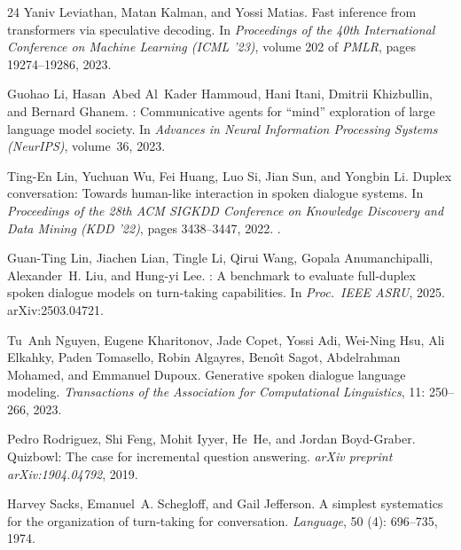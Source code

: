 \documentclass{article}
\begin{document}
\begin{thebibliography}{24}
Yaniv Leviathan, Matan Kalman, and Yossi Matias.
\newblock Fast inference from transformers via speculative decoding.
\newblock In \emph{Proceedings of the 40th International Conference on Machine Learning (ICML '23)}, volume 202 of \emph{PMLR}, pages 19274--19286, 2023.

Guohao Li, Hasan~Abed Al~Kader Hammoud, Hani Itani, Dmitrii Khizbullin, and Bernard Ghanem.
: Communicative agents for ``mind'' exploration of large language model society.
\newblock In \emph{Advances in Neural Information Processing Systems (NeurIPS)}, volume~36, 2023.

Ting-En Lin, Yuchuan Wu, Fei Huang, Luo Si, Jian Sun, and Yongbin Li.
\newblock Duplex conversation: Towards human-like interaction in spoken dialogue systems.
\newblock In \emph{Proceedings of the 28th ACM SIGKDD Conference on Knowledge Discovery and Data Mining (KDD '22)}, pages 3438--3447, 2022.
\newblock {}.

Guan-Ting Lin, Jiachen Lian, Tingle Li, Qirui Wang, Gopala Anumanchipalli, Alexander~H. Liu, and Hung-yi Lee.
: A benchmark to evaluate full-duplex spoken dialogue models on turn-taking capabilities.
\newblock In \emph{Proc.\ IEEE ASRU}, 2025. arXiv:2503.04721.

Tu~Anh Nguyen, Eugene Kharitonov, Jade Copet, Yossi Adi, Wei-Ning Hsu, Ali Elkahky, Paden Tomasello, Robin Algayres, Beno{\^\i}t Sagot, Abdelrahman Mohamed, and Emmanuel Dupoux.
\newblock Generative spoken dialogue language modeling.
\newblock \emph{Transactions of the Association for Computational Linguistics}, 11: 250--266, 2023.

Pedro Rodriguez, Shi Feng, Mohit Iyyer, He~He, and Jordan Boyd-Graber.
\newblock Quizbowl: The case for incremental question answering.
\newblock \emph{arXiv preprint arXiv:1904.04792}, 2019.

Harvey Sacks, Emanuel~A. Schegloff, and Gail Jefferson.
\newblock A simplest systematics for the organization of turn-taking for conversation.
\newblock \emph{Language}, 50 (4): 696--735, 1974.


\end{thebibliography}
\end{document}
